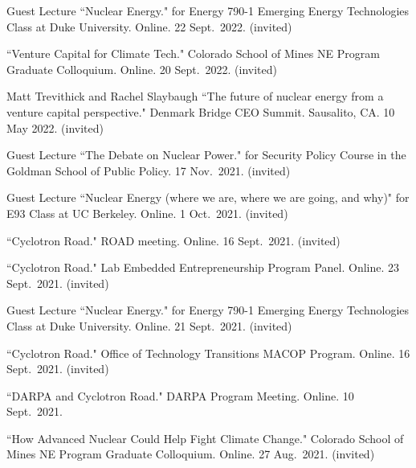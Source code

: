 \begin{bibsection}



\item Guest Lecture ``Nuclear Energy." for Energy 790-1 Emerging Energy Technologies Class at Duke University. Online. 22 Sept.\ 2022. (invited)

\item ``Venture Capital for Climate Tech." Colorado School of Mines NE Program Graduate Colloquium. Online. 20 Sept.\ 2022. (invited)

\item Matt Trevithick and Rachel Slaybaugh ``The future of nuclear energy from a venture capital perspective." Denmark Bridge CEO Summit. Sausalito, CA. 10 May 2022. (invited)

\item Guest Lecture ``The Debate on Nuclear Power." for Security Policy Course in the Goldman School of Public Policy. 17 Nov.\ 2021. (invited)

\item Guest Lecture ``Nuclear Energy  (where we are, where we are going, and why)" for E93 Class at UC Berkeley. Online. 1 Oct.\ 2021. (invited)

\item ``Cyclotron Road." ROAD meeting. Online. 16 Sept.\ 2021. (invited)

\item ``Cyclotron Road." Lab Embedded Entrepreneurship Program Panel. Online. 23 Sept.\ 2021. (invited)

\item Guest Lecture ``Nuclear Energy." for Energy 790-1 Emerging Energy Technologies Class at Duke University. Online. 21 Sept.\ 2021. (invited)

\item ``Cyclotron Road." Office of Technology Transitions MACOP Program. Online. 16 Sept.\ 2021. (invited)

\item ``DARPA and Cyclotron Road." DARPA Program Meeting. Online. 10 Sept.\ 2021. 

\item ``How Advanced Nuclear Could Help Fight Climate Change." Colorado School of Mines NE Program Graduate Colloquium. Online. 27 Aug.\ 2021. (invited)


\end{bibsection}
